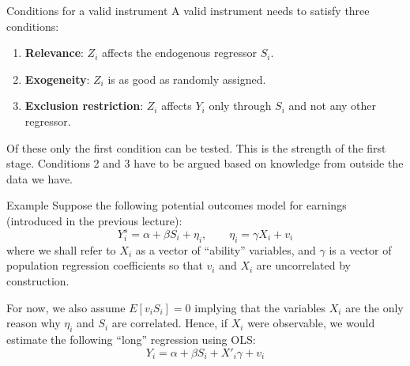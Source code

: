 \documentclass{beamer}
\begin{document}
\begin{frame}{Conditions for a valid instrument}
A valid instrument needs to satisfy three conditions:
\begin{enumerate}
\item \textbf{Relevance}: $Z_i$ affects the endogenous regressor $S_i$. 
\begin{center}
\end{center}
\item \textbf{Exogeneity}: $Z_i$ is as good as randomly assigned. 
\begin{center}
\end{center}
\item \textbf{Exclusion restriction}: $Z_i$ affects $Y_i$ only through $S_i$ and not any other regressor.
\begin{center}
\end{center}
\end{enumerate}
Of these only the first condition can be tested. This is the strength of the first stage. Conditions 2 and 3 have to be argued based on knowledge from outside the data we have.
\end{frame}


\begin{frame}{Example}
Suppose the following potential outcomes model for earnings (introduced in the previous lecture):
\[Y^s_i=\alpha+\beta S_i+\eta_i,\qquad \eta_i=\gamma X_i+v_i \]
where we shall refer to $X_i$ as a vector of ``ability'' variables, and $\gamma$ is a vector of population regression coefficients so that $v_i$ and $X_i$ are uncorrelated by construction.\medskip

For now, we also assume $E[v_iS_i] = 0$ implying that the variables $X_i$ are the only reason why $\eta_i$ and $S_i$ are correlated. Hence, if $X_i$ were observable, we would estimate the following ``long'' regression using OLS:
\[Y_i =\alpha + \beta S_i + X'_i\gamma + v_i\]

\end{frame}
\end{document}
